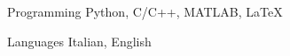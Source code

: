 


\begin{cvskills}


\cvskill
{Programming} %
{Python, C/C++, MATLAB, LaTeX} %



\cvskill
{Languages} %
{Italian, English} %


\end{cvskills}